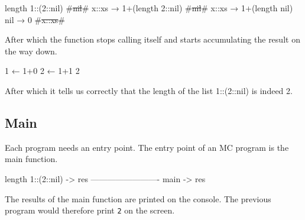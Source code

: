 \begin{MC}[escapeinside=\#\#]
length 1::(2::nil)
    #\st{nil}#
    x::xs → 1+(length 2::nil)
        #\st{nil}#
        x::xs → 1+(length nil)
            nil → 0
            #\st{x::xs}#
\end{MC}

After which the function stops calling itself and starts accumulating the result on the way down.

\begin{MC}[gobble=2]
          1 ← 1+0
      2 ← 1+1
  2
\end{MC}

After which it tells us correctly that the length of the list 1::(2::nil) is indeed 2.

\subsection{Main}
Each program needs an entry point.
The entry point of an MC program is the main function.

\begin{MC}
    length 1::(2::nil) -> res
    -------------------------
    main -> res
\end{MC}

The results of the main function are printed on the console.
The previous program would therefore print \verb|2| on the screen.

